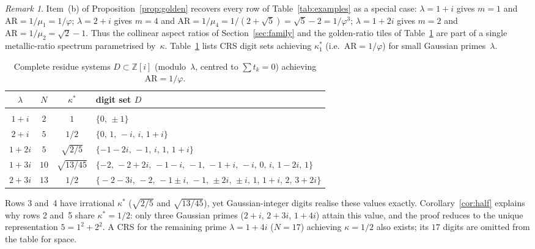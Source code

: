 \documentclass{amsart}
\theoremstyle{definition}
\theoremstyle{remark}
\newtheorem{remark}[theorem]{Remark}
\begin{document}
\begin{remark}
Item~(b) of Proposition~\ref{prop:golden} recovers every row of
Table~\ref{tab:examples} as a special case:
$\lambda=1\!+\!i$ gives $m=1$ and $\mathrm{AR}=1/\mu_1=1/\varphi$;
$\lambda=2\!+\!i$ gives $m=4$ and
$\mathrm{AR}=1/\mu_4=1/(2\!+\!\sqrt{5})=\sqrt{5}-2=1/\varphi^3$;
$\lambda=1\!+\!2i$ gives $m=2$ and $\mathrm{AR}=1/\mu_2=\sqrt{2}-1$.
Thus the collinear aspect ratios of Section~\ref{sec:family} and the
golden-ratio tiles of Table~\ref{tab:kappa} are part of a single
metallic-ratio spectrum parametrised by~$\kappa$.
Table~\ref{tab:kappa} lists CRS digit sets achieving $\kappa_1^*$
(i.e.\ $\mathrm{AR}=1/\varphi$) for small Gaussian primes~$\lambda$.

\begin{table}[ht]
\centering\small
\caption{Complete residue systems $D\subset\mathbb{Z}[i]$
(modulo~$\lambda$, centred to $\sum t_k=0$)
achieving $\mathrm{AR}=1/\varphi$.}
\label{tab:kappa}
\begin{tabular}{cccl}
$\lambda$ & $N$ & $\kappa^*$ & digit set $D$\\[2pt]\hline\\[-8pt]
$1+i$  & $2$  & $1$              & $\{0,\,\pm 1\}$ \\
$2+i$  & $5$  & $1/2$            & $\{0,\,1,\,-i,\,i,\,1\!+\!i\}$ \\
$1+2i$ & $5$  & $\sqrt{2/5}$     & $\{-1\!-\!2i,\,-1,\,i,\,1,\,1\!+\!i\}$ \\
$1+3i$ & $10$ & $\sqrt{13/45}$   & $\{-2,\,-2\!+\!2i,\,-1\!-\!i,\,-1,\,-1\!+\!i,\,-i,\,0,\,i,\,1\!-\!2i,\,1\}$ \\
$2+3i$ & $13$ & $1/2$            & $\{\!-\!2\!-\!3i,\,-2,\,-1\!\pm\!i,\,-1,\,\pm 2i,\,\pm i,\,1,\,1\!+\!i,\,2,\,3\!+\!2i\}$ \\
\end{tabular}
\end{table}

\noindent
Rows 3 and~4 have irrational $\kappa^*$ ($\sqrt{2/5}$ and $\sqrt{13/45}$),
yet Gaussian-integer digits realise these values exactly.
Corollary~\ref{cor:half} explains why rows 2 and~5 share
$\kappa^*\!=\!1/2$: only three Gaussian primes ($2\!+\!i$, $2\!+\!3i$, $1\!+\!4i$)
attain this value, and the proof reduces to the unique representation
$5=1^2+2^2$.
A CRS for the remaining prime $\lambda=1\!+\!4i$ ($N\!=\!17$)
achieving $\kappa\!=\!1/2$ also exists;
its $17$ digits are omitted from the table for space.
\end{remark}
\end{document}
